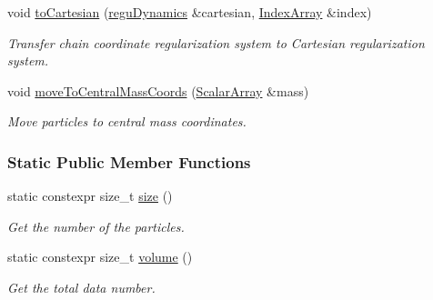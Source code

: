 \begin{DoxyCompactItemize}
void \mbox{\hyperlink{classregu_dynamics_a3dd8d377588308a02396ca6d06945859}{to\+Cartesian}} (\mbox{\hyperlink{classregu_dynamics}{regu\+Dynamics}} \&cartesian, \mbox{\hyperlink{classregu_dynamics_a2c9fa7372e4a11be9d85728b4a0e455f}{Index\+Array}} \&index)
\begin{DoxyCompactList}\small\item\em Transfer chain coordinate regularization system to Cartesian regularization system. \end{DoxyCompactList}\item 
void \mbox{\hyperlink{classregu_dynamics_adb57f1775922d615b8e506eaf79a1bc0}{move\+To\+Central\+Mass\+Coords}} (\mbox{\hyperlink{classregu_dynamics_a34b4b77ea3e49e1cdef584ec8bd281dc}{Scalar\+Array}} \&mass)
\begin{DoxyCompactList}\small\item\em Move particles to central mass coordinates. \end{DoxyCompactList}\end{DoxyCompactItemize}
\subsubsection*{Static Public Member Functions}
\begin{DoxyCompactItemize}
\item 
static constexpr size\+\_\+t \mbox{\hyperlink{classregu_dynamics_a794ed66952b542ae63caa936e3641c4a}{size}} ()
\begin{DoxyCompactList}\small\item\em Get the number of the particles. \end{DoxyCompactList}\item 
static constexpr size\+\_\+t \mbox{\hyperlink{classregu_dynamics_a3a00b2009ce88898871ca024c30c6882}{volume}} ()
\begin{DoxyCompactList}\small\item\em Get the total data number. \end{DoxyCompactList}\end{DoxyCompactItemize}
